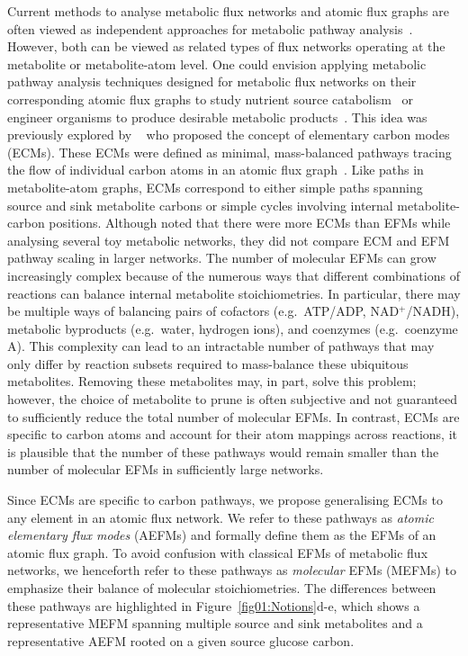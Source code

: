 \documentclass[12pt]{article}
\begin{document}
Current methods to analyse metabolic flux networks and atomic flux graphs
are often viewed as independent approaches for metabolic pathway
analysis~\citep{deFigueiredoLuisF.2009Csbp,AlgfoorZeyadAbd2017Iomp}.
However, both can be viewed as related types of flux networks operating at
the metabolite or metabolite-atom level. One could envision applying
metabolic pathway analysis techniques designed for metabolic flux networks
on their corresponding atomic flux graphs to study nutrient source
catabolism~\citep{ZamboniNicola2015DtMS} or engineer organisms to produce
desirable metabolic products~\citep{ZanghelliniJurgen2013Efmi}. This idea
was previously explored by
\citeauthor{PeyJon2011Defm}~\citep{PeyJon2011Defm} who proposed the
concept of elementary carbon modes (ECMs). These ECMs were defined as
minimal, mass-balanced pathways tracing the flow of individual carbon
atoms in an atomic flux graph~\citep{PeyJon2011Defm,PeyJon2012Itmd}. Like
paths in metabolite-atom graphs, ECMs correspond to either simple paths
spanning source and sink metabolite carbons or simple cycles involving
internal metabolite-carbon positions. Although \citeauthor{PeyJon2012Itmd}
noted that there were more ECMs than EFMs while analysing several toy
metabolic networks, they did not compare ECM and EFM pathway scaling in
larger networks. The number of molecular EFMs can grow increasingly
complex because of the numerous ways that different combinations of
reactions can balance internal metabolite stoichiometries. In particular,
there may be multiple ways of balancing pairs of cofactors (e.g.\ ATP/ADP,
NAD$^+$/NADH), metabolic byproducts (e.g.\ water, hydrogen ions), and
coenzymes (e.g.\ coenzyme A). This complexity can lead to an intractable
number of pathways that may only differ by reaction subsets required to
mass-balance these ubiquitous metabolites. Removing these metabolites may,
in part, solve this problem; however, the choice of metabolite to prune is
often subjective and not guaranteed to sufficiently reduce the total
number of molecular EFMs. In contrast, ECMs are specific to carbon atoms
and account for their atom mappings across reactions, it is plausible that
the number of these pathways would remain smaller than the number of
molecular EFMs in sufficiently large networks.

Since ECMs are specific to carbon pathways, we propose generalising ECMs
to any element in an atomic flux network. We refer to these pathways as
\emph{atomic elementary flux modes} (AEFMs) and formally define them as
the EFMs of an atomic flux graph. To avoid confusion with classical EFMs
of metabolic flux networks, we henceforth refer to these pathways as
\emph{molecular} EFMs (MEFMs) to emphasize their balance of molecular
stoichiometries. The differences between these pathways are highlighted in
Figure~\ref{fig01:Notions}d-e, which shows a representative MEFM spanning
multiple source and sink metabolites and a representative AEFM rooted on
a given source glucose carbon.
\end{document}
